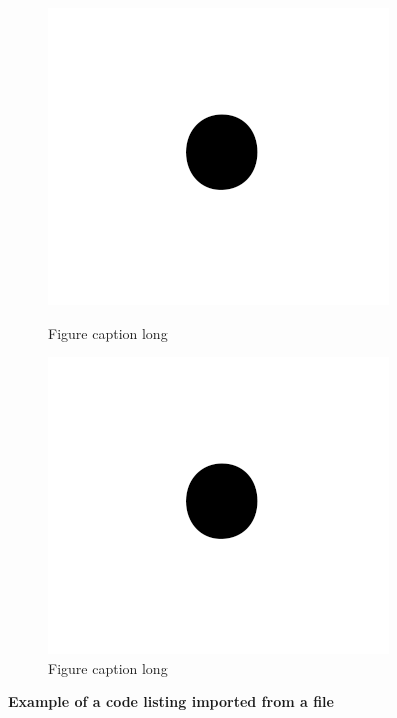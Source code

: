 \begin{figure}[H]
  \centering
  \begin{minipage}[b]{0.45\textwidth}
    \includegraphics[width=\textwidth]{images/small.png}
    \caption[Figure caption short]{Figure caption long}
        \label{fig:test-2}    
  \end{minipage}
  \hfill
  \begin{minipage}[b]{0.45\textwidth}
    \includegraphics[width=\textwidth]{images/small.png}
    \caption[Figure caption short]{Figure caption long}
      \label{fig:test-3}    
  \end{minipage}
\end{figure}

\textbf{Example of a code listing imported from a file}


